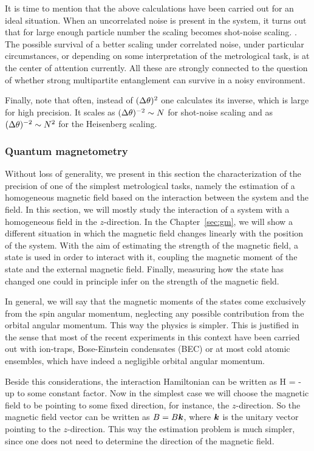 It is time to mention that the above calculations have been carried out for an ideal situation.
When an uncorrelated noise is present in the system, it turns out that for large enough particle number the scaling becomes shot-noise scaling. \cite{Demkowicz-Dobrzanski2012}.
The possible survival of a better scaling under correlated noise, under particular circumstances, or depending on some interpretation of the metrological task, is at the center of attention currently.
All these are strongly connected to the question of whether strong multipartite entanglement can survive in a noisy environment.

Finally, note that often, instead of $(\Delta \theta )^2$ one calculates its inverse, which is large for high precision.
It scales as $(\Delta \theta )^{-2}\sim N$ for shot-noise scaling and as $(\Delta \theta )^{-2}\sim N^2$ for the Heisenberg scaling.

\subsubsection{Quantum magnetometry}
\label{sec:bg-quantum-magnetometry}

Without loss of generality, we present in this section the characterization of the precision of one of the simplest metrological tasks, namely the estimation of a homogeneous magnetic field based on the interaction between the system and the field.
In this section, we will mostly study the interaction of a system with a homogeneous field in the $z$-direction.
In the Chapter~\ref{sec:gm}, we will show a different situation in which the magnetic field changes linearly with the position of the system.
With the aim of estimating the strength of the magnetic field, a state is used in order to interact with it, coupling the magnetic moment of the state and the external magnetic field.
Finally, measuring how the state has changed one could in principle infer on the strength of the magnetic field.

In general, we will say that the magnetic moments of the states come exclusively from the spin angular momentum, neglecting any possible contribution from the orbital angular momentum.
This way the physics is simpler.
This is justified in the sense that most of the recent experiments in this context have been carried out with ion-traps, Bose-Einstein condensates (BEC) or at most cold atomic ensembles, which have indeed a negligible orbital angular momentum.

Beside this considerations, the interaction Hamiltonian can be written as
\be
  H = - \bs{\mu} \cdot {}
\ee
up to some constant factor.
Now in the simplest case we will choose the magnetic field to be pointing to some fixed direction, for instance, the $z$-direction.
So the magnetic field vector can be written as ${B}=B\boldsymbol{k}$, where $\boldsymbol{k}$ is the unitary vector pointing to the $z$-direction.
This way the estimation problem is much simpler, since one does not need to determine the direction of the magnetic field.

